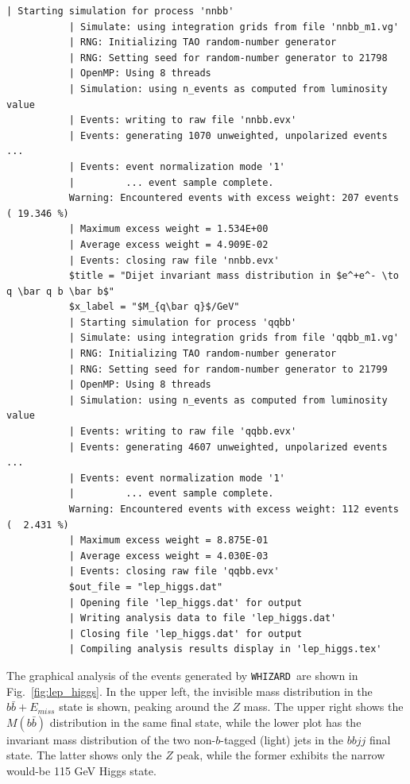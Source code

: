 \documentclass[12pt]{book}
\newcommand{\ttt}[1]{\texttt{#1}}
\newcommand{\whizard}{\ttt{WHIZARD}}
\begin{document}
\begin{scriptsize}
\begin{Verbatim}[frame=single]
           | Starting simulation for process 'nnbb'
           | Simulate: using integration grids from file 'nnbb_m1.vg'
           | RNG: Initializing TAO random-number generator
           | RNG: Setting seed for random-number generator to 21798
           | OpenMP: Using 8 threads
           | Simulation: using n_events as computed from luminosity value
           | Events: writing to raw file 'nnbb.evx'
           | Events: generating 1070 unweighted, unpolarized events ...
           | Events: event normalization mode '1'
           |         ... event sample complete.
           Warning: Encountered events with excess weight: 207 events ( 19.346 %)
           | Maximum excess weight = 1.534E+00
           | Average excess weight = 4.909E-02
           | Events: closing raw file 'nnbb.evx'
           $title = "Dijet invariant mass distribution in $e^+e^- \to q \bar q b \bar b$"
           $x_label = "$M_{q\bar q}$/GeV"
           | Starting simulation for process 'qqbb'
           | Simulate: using integration grids from file 'qqbb_m1.vg'
           | RNG: Initializing TAO random-number generator
           | RNG: Setting seed for random-number generator to 21799
           | OpenMP: Using 8 threads
           | Simulation: using n_events as computed from luminosity value
           | Events: writing to raw file 'qqbb.evx'
           | Events: generating 4607 unweighted, unpolarized events ...
           | Events: event normalization mode '1'
           |         ... event sample complete.
           Warning: Encountered events with excess weight: 112 events (  2.431 %)
           | Maximum excess weight = 8.875E-01
           | Average excess weight = 4.030E-03
           | Events: closing raw file 'qqbb.evx'
           $out_file = "lep_higgs.dat"
           | Opening file 'lep_higgs.dat' for output
           | Writing analysis data to file 'lep_higgs.dat'
           | Closing file 'lep_higgs.dat' for output
           | Compiling analysis results display in 'lep_higgs.tex'
\end{Verbatim}
\end{scriptsize}
The graphical analysis of the events generated by \whizard\ are shown
in Fig.~\ref{fig:lep_higgs}. In the upper left, the invisible mass
distribution in the $b\bar b + E_{miss}$ state is shown, peaking
around the $Z$ mass. The upper right shows the $M(b\bar b)$
distribution in the same final state, while the lower plot has the
invariant mass distribution of the two non-$b$-tagged (light) jets in
the $bbjj$ final state. The latter shows only the $Z$
peak, while the former exhibits the narrow would-be 115 GeV Higgs
state.
\end{document}
